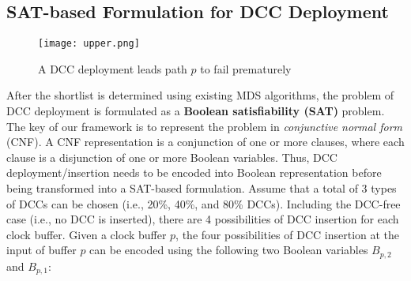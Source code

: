 \subsection{SAT-based Formulation for DCC Deployment}
\label{sec:frame:sat}
\begin{comment}
	\begin{figure*}[!ht]
    	\centering
    	\subfigure[A DCC deployment leads path $p$ to fail prematurely]{
    		\label{fig:sub:upper}
        		\texttt{[image: upper.png]}
    	}
   	\hspace{0.1cm}
    	\subfigure[A DCC deployment leads path $p$ to fail post-maturely]{
    		\label{fig:sub:lower}
        		\texttt{[image: lower.png]}
    	}
    	\caption{Illustrative example for the proposed framework based on DCC deployment/insertion}
    	\label{fig:en}
	\end{figure*}
\end{comment}

\begin{figure}
    	\centering
        	\texttt{[image: upper.png]}
       	\caption{A DCC deployment leads path $p$ to fail prematurely}
    	\label{fig:sec:prefail}
\end{figure}
After the shortlist is determined using existing MDS algorithms, the problem of DCC deployment is formulated as a \textbf{Boolean satisfiability (SAT)} problem. %
The key of our framework is to represent the problem in \textit{conjunctive normal form} (CNF). A CNF representation is a conjunction of one or more clauses, where each clause is a disjunction of one or more Boolean variables. 
Thus, DCC deployment/insertion needs to be encoded into Boolean representation before being transformed into a SAT-based formulation. Assume that a total of 3 types of DCCs can be chosen (i.e., 20\%, 40\%, and 80\% DCCs). Including the DCC-free case (i.e., no DCC is inserted), there are 4 possibilities of DCC insertion for each clock buffer. Given a clock buffer $p$, the four possibilities of DCC insertion at the input of buffer $p$ can be encoded using the following two Boolean variables $B_{p,2}$ and $B_{p,1}$:

